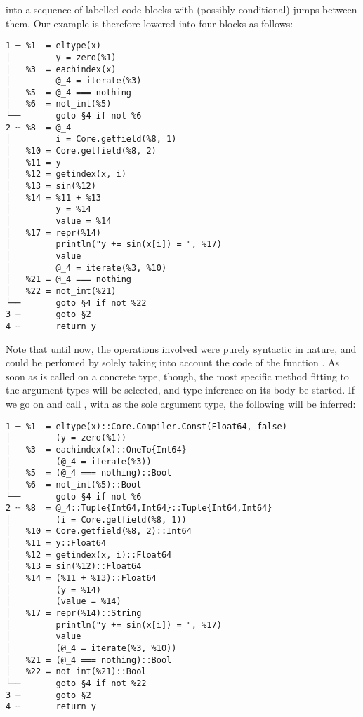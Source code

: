 into a sequence of labelled code blocks with (possibly conditional) jumps between them. Our example
is therefore lowered into four blocks as follows:
\begin{lstlisting}
1 ─ %1  = eltype(x)
│         y = zero(%1)
│   %3  = eachindex(x)
│         @_4 = iterate(%3)
│   %5  = @_4 === nothing
│   %6  = not_int(%5)
└──       goto §4 if not %6
2 ┄ %8  = @_4
│         i = Core.getfield(%8, 1)
│   %10 = Core.getfield(%8, 2)
│   %11 = y
│   %12 = getindex(x, i)
│   %13 = sin(%12)
│   %14 = %11 + %13
│         y = %14
│         value = %14
│   %17 = repr(%14)
│         println("y += sin(x[i]) = ", %17)
│         value
│         @_4 = iterate(%3, %10)
│   %21 = @_4 === nothing
│   %22 = not_int(%21)
└──       goto §4 if not %22
3 ─       goto §2
4 ┄       return y
\end{lstlisting}
Note that until now, the operations involved were purely syntactic in nature, and could be perfomed
by solely taking into account the code of the function .  As soon as  is
called on a concrete type, though, the most specific method fitting to the argument types will be
selected, and type inference on its body be started.  If we go on and call , with
 as the sole argument type, the following will be inferred:
\begin{lstlisting}
1 ─ %1  = eltype(x)::Core.Compiler.Const(Float64, false)
│         (y = zero(%1))
│   %3  = eachindex(x)::OneTo{Int64}
│         (@_4 = iterate(%3))
│   %5  = (@_4 === nothing)::Bool
│   %6  = not_int(%5)::Bool
└──       goto §4 if not %6
2 ┄ %8  = @_4::Tuple{Int64,Int64}::Tuple{Int64,Int64}
│         (i = Core.getfield(%8, 1))
│   %10 = Core.getfield(%8, 2)::Int64
│   %11 = y::Float64
│   %12 = getindex(x, i)::Float64
│   %13 = sin(%12)::Float64
│   %14 = (%11 + %13)::Float64
│         (y = %14)
│         (value = %14)
│   %17 = repr(%14)::String
│         println("y += sin(x[i]) = ", %17)
│         value
│         (@_4 = iterate(%3, %10))
│   %21 = (@_4 === nothing)::Bool
│   %22 = not_int(%21)::Bool
└──       goto §4 if not %22
3 ─       goto §2
4 ┄       return y
\end{lstlisting}


